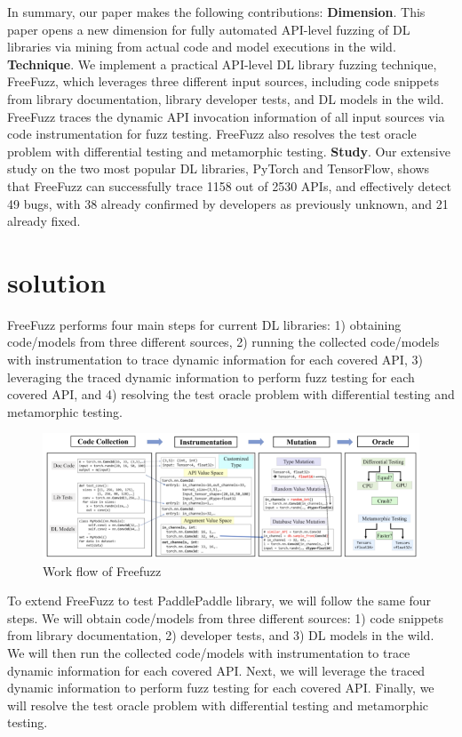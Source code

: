 \documentclass[sigconf]{acmart}
\begin{document}
In summary, our paper makes the following contributions:
\newline\textbf{Dimension}. This paper opens a new dimension for fully
automated API-level fuzzing of DL libraries via mining from
actual code and model executions in the wild.
\newline\textbf{Technique}. We implement a practical API-level DL library
fuzzing technique, FreeFuzz, which leverages three different
input sources, including code snippets from library documentation, library developer tests, and DL models in the
wild. FreeFuzz traces the dynamic API invocation information of all input sources via code instrumentation for fuzz
testing. FreeFuzz also resolves the test oracle problem with
differential testing and metamorphic testing.
\newline\textbf{Study}. Our extensive study on the two most popular DL
libraries, PyTorch and TensorFlow, shows that FreeFuzz can
successfully trace 1158 out of 2530 APIs, and effectively detect 49 bugs, with 38 already confirmed by developers as
previously unknown, and 21 already fixed.



\section{solution}
FreeFuzz performs four main steps for current DL libraries: 1) obtaining code/models from three different sources, 2) running the collected code/models with instrumentation to trace dynamic information for each covered API, 3) leveraging the traced dynamic information to perform fuzz testing for each covered API, and 4) resolving the test oracle problem with differential testing and metamorphic testing.

\begin{figure}[h]
  \centering
  \includegraphics[width=\linewidth]{1.png}
  \caption{Work flow of Freefuzz}
\end{figure}

To extend FreeFuzz to test PaddlePaddle library, we will follow the same four steps. We will obtain code/models from three different sources: 1) code snippets from library documentation, 2) developer tests, and 3) DL models in the wild. We will then run the collected code/models with instrumentation to trace dynamic information for each covered API. Next, we will leverage the traced dynamic information to perform fuzz testing for each covered API. Finally, we will resolve the test oracle problem with differential testing and metamorphic testing.
\end{document}
